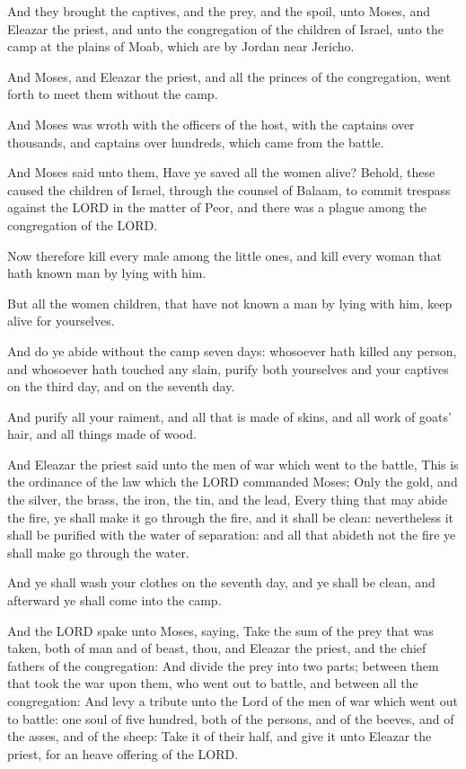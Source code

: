 \Verse And they brought the captives, and the prey, and the spoil, unto
Moses, and Eleazar the priest, and unto the congregation of the
children of Israel, unto the camp at the plains of Moab, which are by
Jordan near Jericho.

\Verse And Moses, and Eleazar the priest, and all the princes of the
congregation, went forth to meet them without the camp.

\Verse And Moses was wroth with the officers of the host, with the
captains over thousands, and captains over hundreds, which came from
the battle.

\Verse And Moses said unto them, Have ye saved all the women alive?
\Verse Behold, these caused the children of Israel, through the counsel
of Balaam, to commit trespass against the LORD in the matter of Peor,
and there was a plague among the congregation of the LORD.

\Verse Now therefore kill every male among the little ones, and kill
every woman that hath known man by lying with him.

\Verse But all the women children, that have not known a man by lying
with him, keep alive for yourselves.

\Verse And do ye abide without the camp seven days: whosoever hath
killed any person, and whosoever hath touched any slain, purify both
yourselves and your captives on the third day, and on the seventh day.

\Verse And purify all your raiment, and all that is made of skins, and
all work of goats' hair, and all things made of wood.

\Verse And Eleazar the priest said unto the men of war which went to
the battle, This is the ordinance of the law which the LORD commanded
Moses; \Verse Only the gold, and the silver, the brass, the iron, the
tin, and the lead, \Verse Every thing that may abide the fire, ye shall
make it go through the fire, and it shall be clean: nevertheless it
shall be purified with the water of separation: and all that abideth
not the fire ye shall make go through the water.

\Verse And ye shall wash your clothes on the seventh day, and ye shall
be clean, and afterward ye shall come into the camp.

\Verse And the LORD spake unto Moses, saying, \Verse Take the sum of the
prey that was taken, both of man and of beast, thou, and Eleazar the
priest, and the chief fathers of the congregation: \Verse And divide
the prey into two parts; between them that took the war upon them, who
went out to battle, and between all the congregation: \Verse And levy a
tribute unto the Lord of the men of war which went out to battle: one
soul of five hundred, both of the persons, and of the beeves, and of
the asses, and of the sheep: \Verse Take it of their half, and give it
unto Eleazar the priest, for an heave offering of the LORD.

